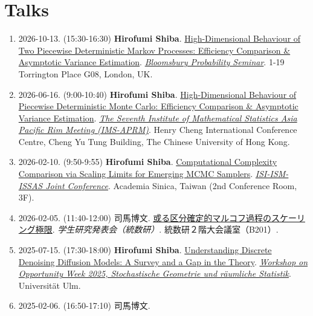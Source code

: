 \documentclass[
  11pt,
]{article}
\begin{document}
\section{Talks}\label{talks}

\begin{enumerate}
\def\labelenumi{\arabic{enumi}.}
\item
  2026-10-13. (15:30-16:30) \textbf{Hirofumi Shiba}.
  \href{https://162348.github.io/posts/2026/Slides/ProbabilityUCL.html}{High-Dimensional
  Behaviour of Two Piecewise Deterministic Markov Processes: Efficiency
  Comparison \& Asymptotic Variance Estimation}.
  \emph{\href{https://sites.google.com/view/probability-at-ucl/hirofumi-shiba}{Bloomsbury
  Probability Seminar}}. 1-19 Torrington Place G08, London, UK.
\item
  2026-06-16. (9:00-10:40) \textbf{Hirofumi Shiba}.
  \href{https://162348.github.io/posts/2026/Slides/IMS-APRM.html}{High-Dimensional
  Behaviour of Piecewise Deterministic Monte Carlo: Efficiency
  Comparison \& Asymptotic Variance Estimation}.
  \emph{\href{https://ims-aprm2026.sta.cuhk.edu.hk/}{The Seventh
  Institute of Mathematical Statistics Asia Pacific Rim Meeting
  (IMS-APRM)}}. Henry Cheng International Conference Centre, Cheng Yu
  Tung Building, The Chinese University of Hong Kong.
\item
  2026-02-10. (9:50-9:55) \textbf{Hirofumi Shiba}.
  \href{https://162348.github.io/posts/2026/Slides/ISI-ISM-ISSAS.html}{Computational
  Complexity Comparison via Scaling Limits for Emerging MCMC Samplers}.
  \emph{\href{https://www3.stat.sinica.edu.tw/3ijc2026/}{ISI-ISM-ISSAS
  Joint Conference}}. Academia Sinica, Taiwan (2nd Conference Room, 3F).
\item
  2026-02-05. (11:40-12:00) 司馬博文.
  \href{https://162348.github.io/posts/2026/Slides/ISM.html}{或る区分確定的マルコフ過程のスケーリング極限}.
  \emph{学生研究発表会（統数研）}. 統数研２階大会議室（B201）.
\item
  2025-07-15. (17:30-18:00) \textbf{Hirofumi Shiba}.
  \href{https://162348.github.io/posts/2025/Slides/DDD.html}{Understanding
  Discrete Denoising Diffusion Models: A Survey and a Gap in the
  Theory}.
  \emph{\href{https://www.uni-ulm.de/en/mawi/mawi-stochastik/forschung/forschungsseminare/forschungsseminar-sommersemester-2025-stochastische-geometrie-und-raeumliche-statistik/}{Workshop
  on Opportunity Week 2025, Stochastische Geometrie und räumliche
  Statistik}}. Universität Ulm.
\item
  2025-02-06. (16:50-17:10) 司馬博文.

\end{enumerate}
\end{document}
